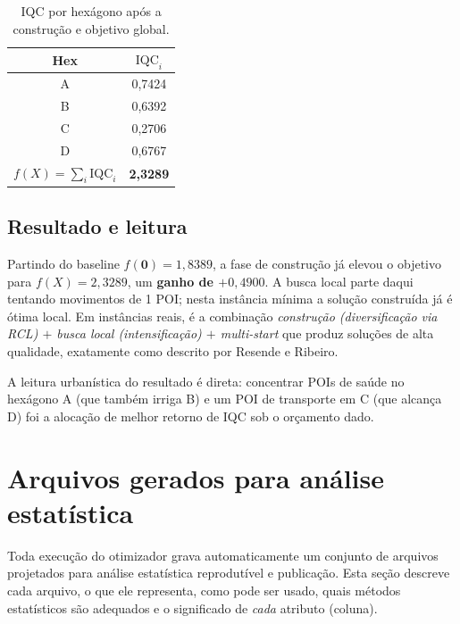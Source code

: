 \documentclass[11pt,a4paper]{article}
\newcommand{\hex}[1]{\textsf{#1}}
\begin{document}
\begin{table}[ht]
\centering
\caption{IQC por hexágono após a construção e objetivo global.}
\label{tab:iqc}
\begin{tabular}{@{}c c@{}}
\toprule
Hex & $\mathrm{IQC}_i$ \\
\midrule
\hex{A} & 0{,}7424 \\
\hex{B} & 0{,}6392 \\
\hex{C} & 0{,}2706 \\
\hex{D} & 0{,}6767 \\
\midrule
$f(X)=\sum_i \mathrm{IQC}_i$ & \textbf{2{,}3289} \\
\bottomrule
\end{tabular}
\end{table}

\subsection{Resultado e leitura}

Partindo do baseline $f(\mathbf 0)=1{,}8389$, a fase de construção já elevou o
objetivo para $f(X)=2{,}3289$, um \textbf{ganho de $+0{,}4900$}. A busca local
parte daqui tentando movimentos de 1 POI; nesta instância mínima a solução
construída já é ótima local. Em instâncias reais, é a combinação
\emph{construção (diversificação via RCL) $+$ busca local (intensificação) $+$
multi-start} que produz soluções de alta qualidade, exatamente como descrito por
Resende e Ribeiro.

A leitura urbanística do resultado é direta: concentrar POIs de saúde no hexágono
\hex{A} (que também irriga \hex{B}) e um POI de transporte em \hex{C} (que
alcança \hex{D}) foi a alocação de melhor retorno de IQC sob o orçamento dado.

\section{Arquivos gerados para análise estatística}
\label{sec:arquivos}

Toda execução do otimizador grava automaticamente um conjunto de arquivos
projetados para análise estatística reprodutível e publicação. Esta seção
descreve cada arquivo, o que ele representa, como pode ser usado, quais métodos
estatísticos são adequados e o significado de \emph{cada} atributo (coluna).
\end{document}
